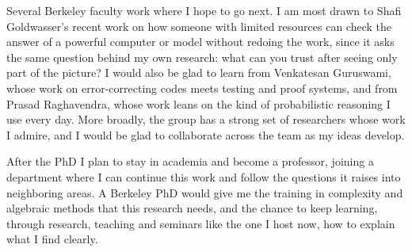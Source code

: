 \documentclass[11pt]{article}
\begin{document}
Several Berkeley faculty work where I hope to go next. I am most drawn to Shafi Goldwasser's recent work on how someone with limited resources can check the answer of a powerful computer or model without redoing the work, since it asks the same question behind my own research: what can you trust after seeing only part of the picture? I would also be glad to learn from Venkatesan Guruswami, whose work on error-correcting codes meets testing and proof systems, and from Prasad Raghavendra, whose work leans on the kind of probabilistic reasoning I use every day. More broadly, the group has a strong set of researchers whose work I admire, and I would be glad to collaborate across the team as my ideas develop.

After the PhD I plan to stay in academia and become a professor, joining a department where I can continue this work and follow the questions it raises into neighboring areas. A Berkeley PhD would give me the training in complexity and algebraic methods that this research needs, and the chance to keep learning, through research, teaching and seminars like the one I host now, how to explain what I find clearly.
\end{document}
